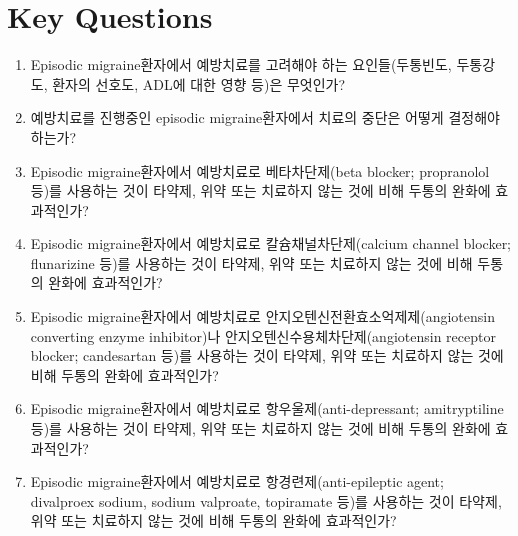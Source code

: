 \documentclass{paper}
\begin{document}
\section{Key Questions}
\begin{enumerate}
	\item Episodic migraine환자에서 예방치료를 고려해야 하는 요인들(두통빈도, 두통강도, 환자의 선호도, ADL에 대한 영향 등)은 무엇인가?
	\item 예방치료를 진행중인 episodic migraine환자에서 치료의 중단은 어떻게 결정해야 하는가?
	\item Episodic migraine환자에서 예방치료로 베타차단제(beta blocker; propranolol 등)를 사용하는 것이 타약제, 위약 또는 치료하지 않는 것에 비해 두통의 완화에 효과적인가?
	\item Episodic migraine환자에서 예방치료로 칼슘채널차단제(calcium channel blocker; flunarizine 등)를 사용하는 것이 타약제, 위약 또는 치료하지 않는 것에 비해 두통의 완화에 효과적인가?
	\item Episodic migraine환자에서 예방치료로 안지오텐신전환효소억제제(angiotensin converting enzyme inhibitor)나 안지오텐신수용체차단제(angiotensin receptor blocker; candesartan 등)를 사용하는 것이 타약제, 위약 또는 치료하지 않는 것에 비해 두통의 완화에 효과적인가?
	\item Episodic migraine환자에서 예방치료로 항우울제(anti-depressant; amitryptiline 등)를 사용하는 것이 타약제, 위약 또는 치료하지 않는 것에 비해 두통의 완화에 효과적인가?
	\item Episodic migraine환자에서 예방치료로 항경련제(anti-epileptic agent; divalproex sodium, sodium valproate, topiramate 등)를 사용하는 것이 타약제, 위약 또는 치료하지 않는 것에 비해 두통의 완화에 효과적인가?
\end{enumerate}

 
\end{document}
